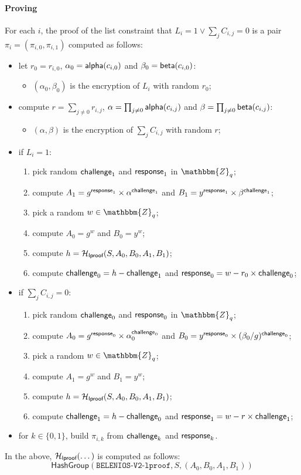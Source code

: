 \documentclass[a4paper]{article}
\newcommand{\dstprefix}{BELENIOS-V2}
\newcommand{\Z}{\mathbbm{Z}}
\begin{document}
\paragraph{Proving}
For each $i$, the proof of the list constraint that
$L_i=1\lor\sum_jC_{i,j}=0$ is a pair $\pi_i=(\pi_{i,0},\pi_{i,1})$
computed as follows:
\begin{itemize}
\item let $r_0=r_{i,0}$, $\alpha_0=\textsf{alpha}(c_{i,0})$ and
  $\beta_0=\textsf{beta}(c_{i,0})$:
  \begin{itemize}
  \item $(\alpha_0,\beta_0)$ is the encryption of $L_i$ with random $r_0$;
  \end{itemize}
\item compute $r=\sum_{j\neq 0}r_{i,j}$,
  $\alpha=\prod_{j\neq 0}\textsf{alpha}(c_{i,j})$ and
  $\beta=\prod_{j\neq 0}\textsf{beta}(c_{i,j})$:
  \begin{itemize}
  \item $(\alpha,\beta)$ is the encryption of $\sum_jC_{i,j}$ with random $r$;
  \end{itemize}
\item if $L_i=1$:
  \begin{enumerate}
  \item pick random $\textsf{challenge}_1$ and $\textsf{response}_1$ in $\Z_q$;
  \item compute $A_1=g^{\textsf{response}_1}\times\alpha^{\textsf{challenge}_1}$ and
    $B_1=y^{\textsf{response}_1}\times\beta^{\textsf{challenge}_1}$;
  \item pick a random $w\in\Z_q$;
  \item compute $A_0=g^w$ and $B_0=y^w$;
  \item compute $h=\mathcal{H}_{\textsf{lproof}}(S,A_0,B_0,A_1,B_1)$;
  \item compute $\textsf{challenge}_0=h-\textsf{challenge}_1$ and
    $\textsf{response}_0=w-r_0\times\textsf{challenge}_0$;
  \end{enumerate}
\item if $\sum_jC_{i,j}=0$:
  \begin{enumerate}
  \item pick random $\textsf{challenge}_0$ and $\textsf{response}_0$ in $\Z_q$;
  \item compute $A_0=g^{\textsf{response}_0}\times\alpha_0^{\textsf{challenge}_0}$ and
    $B_0=y^{\textsf{response}_0}\times(\beta_0/g)^{\textsf{challenge}_0}$;
  \item pick a random $w\in\Z_q$;
  \item compute $A_1=g^w$ and $B_1=y^w$;
  \item compute $h=\mathcal{H}_{\textsf{lproof}}(S,A_0,B_0,A_1,B_1)$;
  \item compute $\textsf{challenge}_1=h-\textsf{challenge}_0$ and
    $\textsf{response}_1=w-r\times\textsf{challenge}_1$;
  \end{enumerate}
\item for $k\in\{0,1\}$, build $\pi_{i,k}$ from $\textsf{challenge}_k$ and
  $\textsf{response}_k$.
\end{itemize}
In the above, $\mathcal{H}_{\textsf{lproof}}(\dotsc)$ is computed as follows:
\[
  \textsf{HashGroup}(\texttt{\dstprefix-lproof},S,(A_0,B_0,A_1,B_1))
\]
\end{document}
